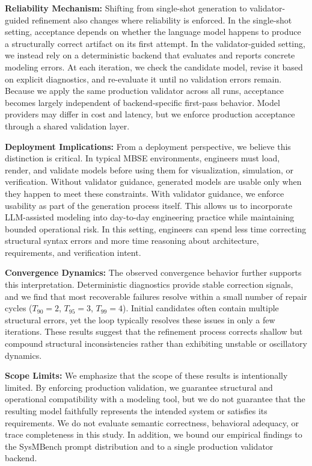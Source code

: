 \documentclass[colorlinks,upint,subscriptcorrection,varvw,hyphenate,balance]{asmeconf} %
\begin{document}
\textbf{Reliability Mechanism:} Shifting from single-shot generation to validator-guided refinement also changes where reliability is enforced. In the single-shot setting, acceptance depends on whether the language model happens to produce a structurally correct artifact on its first attempt. In the validator-guided setting, we instead rely on a deterministic backend that evaluates and reports concrete modeling errors. At each iteration, we check the candidate model, revise it based on explicit diagnostics, and re-evaluate it until no validation errors remain. Because we apply the same production validator across all runs, acceptance becomes largely independent of backend-specific first-pass behavior. Model providers may differ in cost and latency, but we enforce production acceptance through a shared validation layer.

\textbf{Deployment Implications:} From a deployment perspective, we believe this distinction is critical. In typical MBSE environments, engineers must load, render, and validate models before using them for visualization, simulation, or verification. Without validator guidance, generated models are usable only when they happen to meet these constraints. With validator guidance, we enforce usability as part of the generation process itself. This allows us to incorporate LLM-assisted modeling into day-to-day engineering practice while maintaining bounded operational risk. In this setting, engineers can spend less time correcting structural syntax errors and more time reasoning about architecture, requirements, and verification intent.

\textbf{Convergence Dynamics:} The observed convergence behavior further supports this interpretation. Deterministic diagnostics provide stable correction signals, and we find that most recoverable failures resolve within a small number of repair cycles ($T_{90}=2$, $T_{95}=3$, $T_{99}=4$). Initial candidates often contain multiple structural errors, yet the loop typically resolves these issues in only a few iterations. These results suggest that the refinement process corrects shallow but compound structural inconsistencies rather than exhibiting unstable or oscillatory dynamics.

\textbf{Scope Limits:} We emphasize that the scope of these results is intentionally limited. By enforcing production validation, we guarantee structural and operational compatibility with a modeling tool, but we do not guarantee that the resulting model faithfully represents the intended system or satisfies its requirements. We do not evaluate semantic correctness, behavioral adequacy, or trace completeness in this study. In addition, we bound our empirical findings to the SysMBench prompt distribution and to a single production validator backend.
\end{document}

